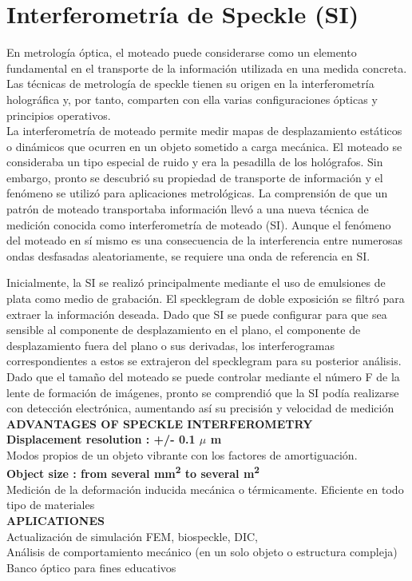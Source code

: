 \documentclass[12pt]{article}
\begin{document}
	\section{Interferometría de Speckle (SI)}
	\colorbox{gray!20}{\parbox{\textwidth}{
			En metrología óptica, el moteado puede considerarse como un elemento fundamental en el transporte de la información utilizada en una medida concreta. Las técnicas de metrología de speckle tienen su origen en la interferometría holográfica y, por tanto, comparten con ella varias configuraciones ópticas y principios operativos. \\
			
			La interferometría de moteado permite medir mapas de desplazamiento estáticos o dinámicos que ocurren en un objeto sometido a carga mecánica. El moteado se consideraba un tipo especial de ruido y era la pesadilla de los hológrafos. Sin embargo, pronto se descubrió su propiedad de transporte de información y el fenómeno se utilizó para aplicaciones metrológicas. La comprensión de que un patrón de moteado transportaba información llevó a una nueva técnica de medición conocida como interferometría de moteado (SI). Aunque el fenómeno del moteado en sí mismo es una consecuencia de la interferencia entre numerosas ondas desfasadas aleatoriamente, se requiere una onda de referencia en SI.
	}}
	
	\colorbox{gray!10}{\parbox{\textwidth}{
			Inicialmente, la SI se realizó principalmente mediante el uso de emulsiones de plata como medio de grabación. El specklegram de doble exposición se filtró para extraer la información deseada. Dado que SI se puede configurar para que sea sensible al componente de desplazamiento en el plano, el componente de desplazamiento fuera del plano o sus derivadas, los interferogramas correspondientes a estos se extrajeron del specklegram para su posterior análisis. Dado que el tamaño del moteado se puede controlar mediante el número F de la lente de formación de imágenes, pronto se comprendió que la SI podía realizarse con detección electrónica, aumentando así su precisión y velocidad de medición \\
			\textbf{ADVANTAGES OF SPECKLE INTERFEROMETRY} \\
			\textbf{Displacement resolution : +/- 0.1 $\mu$ m} \\
			Modos propios de un objeto vibrante con los factores de amortiguación. \\
			\textbf{Object size : from several mm\textsuperscript{2} to several m\textsuperscript{2}} \\
			Medición de la deformación inducida mecánica o térmicamente. Eficiente en todo tipo de materiales \\
			\textbf{APLICATIONES} \\
			Actualización de simulación FEM, biospeckle, DIC, \\
			Análisis de comportamiento mecánico (en un solo objeto o estructura compleja) \\
			Banco óptico para fines educativos
	}}
	
\end{document}
